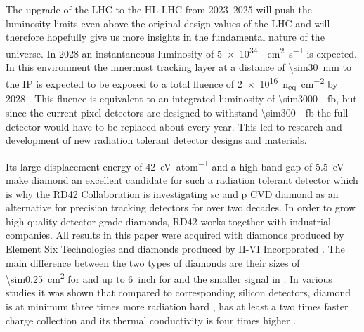 The upgrade of the \ac{LHC} to the \ac{HL-LHC} from \SIrange{2023}{2025}{} \cite{hllhc} will push the luminosity limits even above the original design values of the \ac{LHC} and will therefore hopefully give us more insights in the fundamental nature of the universe. In 2028 an instantaneous luminosity of \SI{5e34}{\per\centi\meter\squared\per\second} is expected. In this environment the innermost tracking layer at a distance of \SI{\sim30}{\milli\meter} to the \ac{IP}
is expected to be exposed to a total fluence of \SI{2e16}{n_{eq}\per \centi\meter^2} by 2028 \cite{auzinger}. This fluence is equivalent to an integrated luminosity of \SI{\sim3000}{\per\femto\barn}, but since the  current pixel detectors are designed to withstand \SI{\sim300}{\per\femto\barn} the full detector would have to be replaced about every year. This led to research and development of new radiation tolerant detector designs and materials.\par
Its large displacement energy of \SI{42}{\electronvolt\per atom} and a high band gap of \SI{5.5}{\electronvolt} make diamond an excellent candidate for such a radiation tolerant detector which is why the RD42 Collaboration is investigating \ac{sc} and \ac{p} \ac{CVD} diamond as an alternative for precision tracking detectors for over two decades. In order to grow high quality detector grade diamonds, RD42 works together with industrial companies. All results in this paper were acquired with \sccvd diamonds produced by Element Six Technologies \cite{e6} and \pcvd diamonds produced by II-VI Incorporated \cite{II6}. The main difference between the two types of diamonds are their sizes of \SI{\sim0.25}{\centi\meter\squared} for \sccvd and up to \SI{6}{inch} for \pcvd and the smaller signal in \pcvd \cite{felix}.
In various studies it was shown that compared to corresponding silicon detectors, diamond is at minimum three times more radiation hard \cite{deboer}, has at least a two times faster charge collection \cite{pernegger} and its thermal conductivity is four times higher \cite{zhao}.\par
